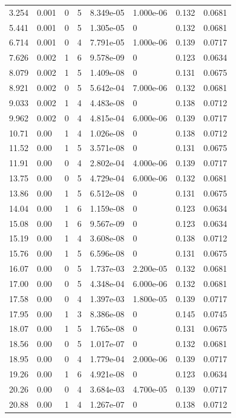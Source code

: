 \documentclass[preview]{standalone}
\begin{document}
{{\begin{tabular}{L{1.2cm}C{1.2cm} C{0.3cm}C{0.5cm} C{1.4cm}C{1.4cm} C{1.4cm}C{1.4cm}}
  3.254  &  0.001  & 0     &  5 &  8.349e-05  & 1.000e-06  & 0.132 &  0.0681   \\ 
  5.441  &  0.001  & 0     &  5 &  1.305e-05  & 0  & 0.132 &  0.0681   \\ 
  6.714  &  0.001  & 0     &  4 &  7.791e-05  & 1.000e-06  & 0.139 &  0.0717   \\ 
  7.626  &  0.002  & 1     &  6 &  9.578e-09  & 0  & 0.123 &  0.0634   \\ 
  8.079  &  0.002  & 1     &  5 &  1.409e-08  & 0  & 0.131 &  0.0675   \\ 
  8.921  &  0.002  & 0     &  5 &  5.642e-04  & 7.000e-06  & 0.132 &  0.0681   \\ 
  9.033  &  0.002  & 1     &  4 &  4.483e-08  & 0  & 0.138 &  0.0712   \\ 
  9.962  &  0.002  & 0     &  4 &  4.815e-04  & 6.000e-06  & 0.139 &  0.0717   \\ 
  10.71  &  0.00  & 1     &  4 &  1.026e-08  & 0  & 0.138 &  0.0712   \\ 
  11.52  &  0.00  & 1     &  5 &  3.571e-08  & 0  & 0.131 &  0.0675   \\ 
  11.91  &  0.00  & 0     &  4 &  2.802e-04  & 4.000e-06  & 0.139 &  0.0717   \\ 
  13.75  &  0.00  & 0     &  5 &  4.729e-04  & 6.000e-06  & 0.132 &  0.0681   \\ 
  13.86  &  0.00  & 1     &  5 &  6.512e-08  & 0  & 0.131 &  0.0675   \\ 
  14.04  &  0.00  & 1     &  6 &  1.159e-08  & 0  & 0.123 &  0.0634   \\ 
  15.08  &  0.00  & 1     &  6 &  9.567e-09  & 0  & 0.123 &  0.0634   \\ 
  15.19  &  0.00  & 1     &  4 &  3.608e-08  & 0  & 0.138 &  0.0712   \\ 
  15.76  &  0.00  & 1     &  5 &  6.596e-08  & 0  & 0.131 &  0.0675   \\ 
  16.07  &  0.00  & 0     &  5 &  1.737e-03  & 2.200e-05  & 0.132 &  0.0681   \\ 
  17.00  &  0.00  & 0     &  5 &  4.348e-04  & 6.000e-06  & 0.132 &  0.0681   \\ 
  17.58  &  0.00  & 0     &  4 &  1.397e-03  & 1.800e-05  & 0.139 &  0.0717   \\ 
  17.95  &  0.00  & 1     &  3 &  8.386e-08  & 0  & 0.145 &  0.0745   \\ 
  18.07  &  0.00  & 1     &  5 &  1.765e-08  & 0  & 0.131 &  0.0675   \\ 
  18.56  &  0.00  & 0     &  5 &  1.017e-07  & 0  & 0.132 &  0.0681   \\ 
  18.95  &  0.00  & 0     &  4 &  1.779e-04  & 2.000e-06  & 0.139 &  0.0717   \\ 
  19.26  &  0.00  & 1     &  6 &  4.921e-08  & 0  & 0.123 &  0.0634   \\ 
  20.26  &  0.00  & 0     &  4 &  3.684e-03  & 4.700e-05  & 0.139 &  0.0717   \\ 
  20.88  &  0.00  & 1     &  4 &  1.267e-07  & 0  & 0.138 &  0.0712   \\ 
\hline 
\end{tabular} 

}}
\end{document}

